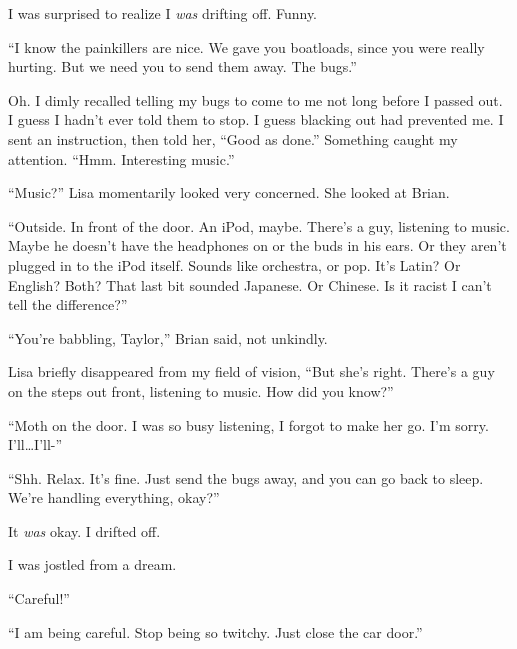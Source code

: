 I was surprised to realize I \emph{was} drifting off.  Funny.



``I know the painkillers are nice.  We gave you boatloads, since you were really hurting.  But we need you to send them away.  The bugs.''



Oh.  I dimly recalled telling my bugs to come to me not long before I passed out.  I guess I hadn't ever told them to stop.  I guess blacking out had prevented me.  I sent an instruction, then told her, ``Good as done.''  Something caught my attention. ``Hmm.  Interesting music.''



``Music?''  Lisa momentarily looked very concerned.  She looked at Brian.



``Outside.  In front of the door.  An iPod, maybe.  There's a guy, listening to music.  Maybe he doesn't have the headphones on or the buds in his ears.  Or they aren't plugged in to the iPod itself.  Sounds like orchestra, or pop.  It's Latin?  Or English?  Both?  That last bit sounded Japanese.  Or Chinese.  Is it racist I can't tell the difference?''



``You're babbling, Taylor,'' Brian said, not unkindly.



Lisa briefly disappeared from my field of vision, ``But she's right.  There's a guy on the steps out front, listening to music.  How did you know?''



``Moth on the door.  I was so busy listening, I forgot to make her go.  I'm sorry.  I'll\ldots I'll-''



``Shh.  Relax.  It's fine.  Just send the bugs away, and you can go back to sleep.  We're handling everything, okay?''



It \emph{was} okay.  I drifted off.



\sectionbreak



I was jostled from a dream.



``Careful!''



``I am being careful.  Stop being so twitchy.  Just close the car door.''



